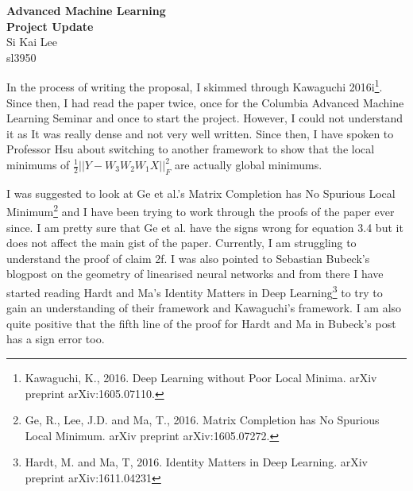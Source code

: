 \documentclass[12pt]{article}
\begin{document}
\begin{center}
  \Large \textbf{Advanced Machine Learning} \\
  \Large \textbf{Project Update} \\
  \vspace{0.1in}
  \normalsize Si Kai Lee \\
  \normalsize sl3950 \\
\end{center}

In the process of writing the proposal, I skimmed through Kawaguchi 2016i\footnote{Kawaguchi, K., 2016. Deep Learning without Poor Local Minima. arXiv preprint arXiv:1605.07110.}. Since then, I had read the paper twice, once for the Columbia Advanced Machine Learning Seminar and once to start the project. However, I could not understand it as It was really dense and not very well written. Since then, I have spoken to Professor Hsu about switching to another framework to show that the local minimums of $\frac{1}{2}||Y - W_3 W_2 W_1 X||_F^2$ are actually global minimums. 

I was suggested to look at Ge et al.'s Matrix Completion has No Spurious Local Minimum\footnote{Ge, R., Lee, J.D. and Ma, T., 2016. Matrix Completion has No Spurious Local Minimum. arXiv preprint arXiv:1605.07272.} and I have been trying to work through the proofs of the paper ever since. I am pretty sure that Ge et al. have the signs wrong for equation 3.4 but it does not affect the main gist of the paper. Currently, I am struggling to understand the proof of claim 2f. I was also pointed to Sebastian Bubeck's blogpost on the geometry of linearised neural networks and from there I have started reading Hardt and Ma's Identity Matters in Deep Learning\footnote{Hardt, M. and Ma, T, 2016. Identity Matters in Deep Learning. arXiv preprint arXiv:1611.04231} to try to gain an understanding of their framework and Kawaguchi's framework. I am also quite positive that the fifth line of the proof for Hardt and Ma in Bubeck's post has a sign error too.
\end{document}
